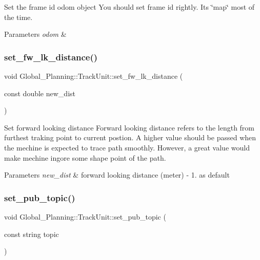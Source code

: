 Set the frame id odom object You should set frame id rightly. It\textquotesingle{}s \char`\"{}map\char`\"{} most of the time. 


\begin{DoxyParams}{Parameters}
{\em odom} & \\
\hline
\end{DoxyParams}
\mbox{\label{class_global___planning_1_1_track_unit_ae34bc618e5a33012f26d986883b6ead3}} 
\subsubsection{\texorpdfstring{set\+\_\+fw\+\_\+lk\+\_\+distance()}{set\_fw\_lk\_distance()}}
{\footnotesize\ttfamily void Global\+\_\+\+Planning\+::\+Track\+Unit\+::set\+\_\+fw\+\_\+lk\+\_\+distance (\begin{DoxyParamCaption}\item[{const double}]{new\+\_\+dist }\end{DoxyParamCaption})}



Set forward looking distance Forward looking distance refers to the length from furthest traking point to current postion. A higher value should be passed when the mechine is expected to trace path smoothly. However, a great value would make mechine ingore some shape point of the path. 


\begin{DoxyParams}{Parameters}
{\em new\+\_\+dist} & forward looking distance (meter) -\/ 1. as default \\
\hline
\end{DoxyParams}
\mbox{\label{class_global___planning_1_1_track_unit_ae00c18addf83cc57a0ddfead96d53113}} 
\subsubsection{\texorpdfstring{set\+\_\+pub\+\_\+topic()}{set\_pub\_topic()}}
{\footnotesize\ttfamily void Global\+\_\+\+Planning\+::\+Track\+Unit\+::set\+\_\+pub\+\_\+topic (\begin{DoxyParamCaption}\item[{const string}]{topic }\end{DoxyParamCaption})}



